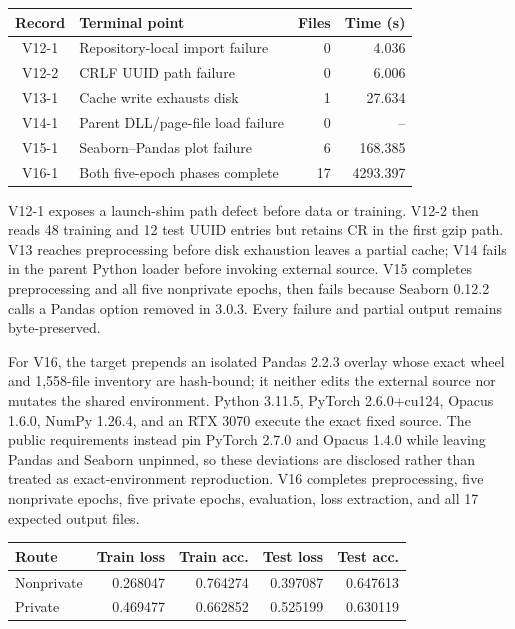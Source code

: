\documentclass[letterpaper]{article} %
\begin{document}
\begin{center}
\centering
\scriptsize
\setlength{\tabcolsep}{3pt}
\begin{tabular}{clrr}
\toprule
Record & Terminal point & Files & Time (s) \\
\midrule
V12-1 & Repository-local import failure & 0 & 4.036 \\
V12-2 & CRLF UUID path failure & 0 & 6.006 \\
V13-1 & Cache write exhausts disk & 1 & 27.634 \\
V14-1 & Parent DLL/page-file load failure & 0 & -- \\
V15-1 & Seaborn--Pandas plot failure & 6 & 168.385 \\
V16-1 & Both five-epoch phases complete & 17 & 4293.397 \\
\bottomrule
\end{tabular}
\label{tab:supp-external-intake}
\end{center}

V12-1 exposes a launch-shim path defect before data or training.  V12-2 then
reads 48 training and 12 test UUID entries but retains CR in the first gzip
path.  V13 reaches preprocessing before disk exhaustion leaves a partial
cache; V14 fails in the parent Python loader before invoking external source.
V15 completes preprocessing and all five nonprivate epochs, then fails because
Seaborn 0.12.2 calls a Pandas option removed in 3.0.3.  Every failure and
partial output remains byte-preserved.

For V16, the target prepends an isolated Pandas 2.2.3 overlay whose exact wheel
and 1,558-file inventory are hash-bound; it neither edits the external source
nor mutates the shared environment.  Python 3.11.5, PyTorch 2.6.0+cu124,
Opacus 1.6.0, NumPy 1.26.4, and an RTX 3070 execute the exact fixed source.
The public requirements instead pin PyTorch 2.7.0 and Opacus 1.4.0 while
leaving Pandas and Seaborn unpinned, so these deviations are disclosed rather
than treated as exact-environment reproduction.  V16 completes preprocessing,
five nonprivate epochs, five private epochs, evaluation, loss extraction, and
all 17 expected output files.

\begin{center}
\centering
\small
\setlength{\tabcolsep}{4pt}
\begin{tabular}{lrrrr}
\toprule
Route & Train loss & Train acc. & Test loss & Test acc. \\
\midrule
Nonprivate & 0.268047 & 0.764274 & 0.397087 & 0.647613 \\
Private & 0.469477 & 0.662852 & 0.525199 & 0.630119 \\
\bottomrule
\end{tabular}
\label{tab:supp-external-v16-diagnostics}
\end{center}
\end{document}
